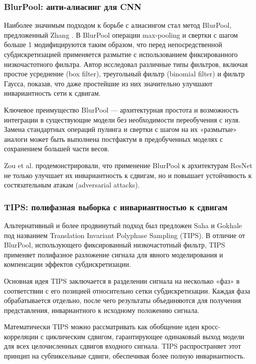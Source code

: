 \subsubsection{BlurPool: анти-алиасинг для CNN}
\label{review:antialias:blurpool}

Наиболее значимым подходом к борьбе с алиасингом стал метод BlurPool, предложенный Zhang \cite{Zhang2019blurpool}. В BlurPool операции max-pooling и свертки с шагом больше 1 модифицируются таким образом, что перед непосредственной субдискретизацией применяется размытие с использованием фиксированного низкочастотного фильтра. Автор исследовал различные типы фильтров, включая простое усреднение (box filter), треугольный фильтр (binomial filter) и фильтр Гаусса, показав, что даже простейшие из них значительно улучшают инвариантность сети к сдвигам.

Ключевое преимущество BlurPool — архитектурная простота и возможность интеграции в существующие модели без необходимости переобучения с нуля. Замена стандартных операций пулинга и свертки с шагом на их «размытые» аналоги может быть выполнена постфактум в предобученных моделях с сохранением большей части весов.

Zou et al. \cite{zou2020delving} продемонстрировали, что применение BlurPool к архитектурам ResNet не только улучшает их инвариантность к сдвигам, но и повышает устойчивость к состязательным атакам (adversarial attacks).

\subsubsection{TIPS: полифазная выборка с инвариантностью к сдвигам}
\label{review:antialias:tips}

Альтернативный и более продвинутый подход был предложен Saha и Gokhale \cite{saha2024tips} под названием Translation Invariant Polyphase Sampling (TIPS). В отличие от BlurPool, использующего фиксированный низкочастотный фильтр, TIPS применяет полифазное разложение сигнала для явного моделирования и компенсации эффектов субдискретизации.

Основная идея TIPS заключается в разделении сигнала на несколько «фаз» в соответствии с его позицией относительно сетки субдискретизации. Каждая фаза обрабатывается отдельно, после чего результаты объединяются для получения представления, инвариантного к исходному положению сигнала.

Математически TIPS можно рассматривать как обобщение идеи кросс-корреляции с циклическим сдвигом, гарантирующее одинаковый выход модели для всех целочисленных сдвигов входного сигнала. TIPS распространяет этот принцип на субпиксельные сдвиги, обеспечивая более полную инвариантность.


